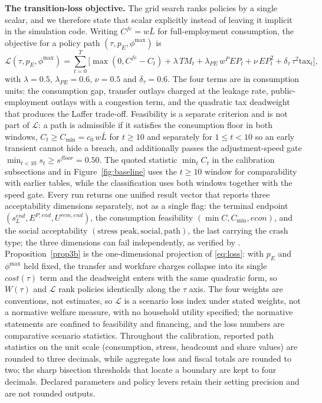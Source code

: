 \documentclass[review,12pt]{elsarticle}
\theoremstyle{plain}
\theoremstyle{definition}
\theoremstyle{remark}
\newcommand{\barL}{\bar{L}}
\begin{document}
\smallskip\noindent\textbf{The transition-loss objective.}
The grid search ranks policies by a single scalar, and we therefore state that scalar explicitly instead of leaving it implicit in the simulation code. Writing $C^{fe}=w\barL$ for full-employment consumption, the objective for a policy path $(\tau,p_E,\phi^{\max})$ is
\begin{equation}
\mathcal{L}(\tau,p_E,\phi^{\max})
=\sum_{t=0}^{T}\Big[
\max(0,C^{fe}-C_t)
+\lambda\,TM_t
+\lambda_{PE}\,w^{P}EP_t+\nu\,EP_t^{2}
+\delta_\tau\,\tau^{2}\text{tax}_t
\Big],
\label{eq:loss}
\end{equation}
with $\lambda=0.5$, $\lambda_{PE}=0.6$, $\nu=0.5$ and $\delta_\tau=0.6$.
The four terms are in consumption units: the consumption gap, transfer outlays charged at the leakage rate, public-employment outlays with a congestion term, and the quadratic tax deadweight that produces the Laffer trade-off.
Feasibility is a separate criterion and is not part of $\mathcal{L}$: a path is admissible if it satisfies the consumption floor in both windows, $C_t\ge C_{\min}=c_0\,w\barL$ for $t\ge10$ and separately for $1\le t<10$ so an early transient cannot hide a breach, and additionally passes the adjustment-speed gate $\min_{t<10}s_t\ge s^{floor}=0.50$. The quoted statistic $\min_tC_t$ in the calibration subsections and in Figure~\ref{fig:baseline} uses the $t\ge10$ window for comparability with earlier tables, while the classification uses both windows together with the speed gate. Every run returns one unified result vector that reports three acceptability dimensions separately, not as a single flag: the terminal endpoint $(s_L^{end},E^{P,end},U^{rem,end})$, the consumption feasibility $(\min C,C_{\min},econ)$, and the social acceptability $(\text{stress peak},\text{social},\text{path})$, the last carrying the crash type; the three dimensions can fail independently, as verified by .
Proposition~\ref{prop3b} is the one-dimensional projection of \eqref{eq:loss}: with $p_E$ and $\phi^{\max}$ held fixed, the transfer and workfare charges collapse into its single $cost(\tau)$ term and the deadweight enters with the same quadratic form, so $W(\tau)$ and $\mathcal{L}$ rank policies identically along the $\tau$ axis.
The four weights are conventions, not estimates, so $\mathcal{L}$ is a scenario loss index under stated weights, not a normative welfare measure, with no household utility specified; the normative statements are confined to feasibility and financing, and the loss numbers are comparative scenario statistics.
Throughout the calibration, reported path statistics on the unit scale (consumption, stress, headcount and share values) are rounded to three decimals, while aggregate loss and fiscal totals are rounded to two; the sharp bisection thresholds that locate a boundary are kept to four decimals. Declared parameters and policy levers retain their setting precision and are not rounded outputs.
\end{document}
